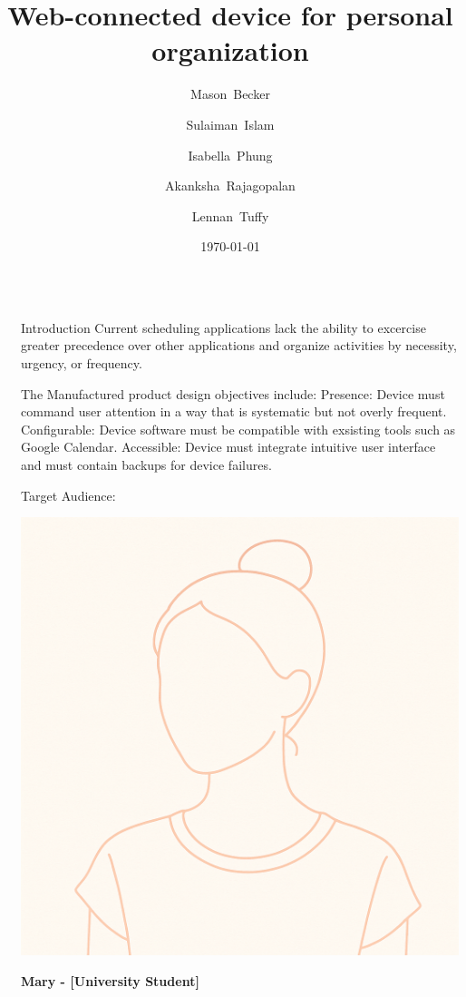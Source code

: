 \documentclass[final]{beamer}
\title{Web-connected device for personal organization}
\author{
  Mason~Becker
  \and
  Sulaiman~Islam
  \and
  Isabella~Phung
  \and
  Akanksha~Rajagopalan
  \and
  Lennan~Tuffy
}
\institute[UC Santa Cruz]{CSE 123 - Supervised by Prof. David Harrison}
\date{\today}
\newlength{\sepwidth}
\newlength{\colwidth}
\newcommand{\separatorcolumn}{\begin{column}{\sepwidth}\end{column}}
\begin{document}
\begin{frame}[t]
  \begin{columns}[t]
    \separatorcolumn

    \begin{column}{\colwidth}

      \begin{block}{Introduction}
        Current scheduling applications lack the ability to excercise 
        greater precedence over other applications 
        and organize activities by necessity, urgency, or frequency.

        The Manufactured product design objectives include:
        Presence: Device must command user attention in a way that is systematic but not overly frequent.
        Configurable: Device software must be compatible with exsisting tools such as Google Calendar.
        Accessible: Device must integrate intuitive user interface and must contain backups for device failures. 
       
        Target Audience:
        \vspace{0.4cm}
    
        \begin{minipage}[t]{0.3\linewidth}
          \centering
          \includegraphics[width=0.8\linewidth]{Mary.png}
        \end{minipage}
        \hfill
        \begin{minipage}[t]{0.65\linewidth}
          \textbf{Mary - [University Student]}
          

\end{minipage}
\end{block}
\end{column}
\end{columns}
\end{frame}
\end{document}

